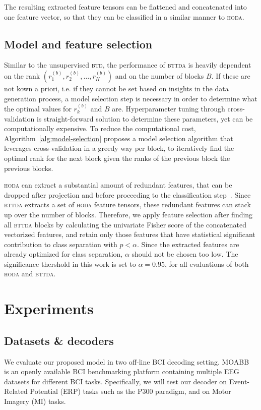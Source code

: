 \documentclass[twocolumn]{article}
\begin{document}
The resulting extracted feature tensors can be flattened and concatenated into
one feature vector, so that they can be classified in a similar manner to
\textsc{hoda}.


\subsection{Model and feature selection}
Similar to the unsupervised \textsc{btd}, the performance of \textsc{bttda} is
heavily dependent on the rank $\left(r_1^{(b)}, r_2^{(b)}, \ldots,
r_K^{(b)}\right)$ and on the number of blocks $B$.
If these are not kown a priori, i.e. if they cannot be set based on insights in the
data generation process, a model selection step is necessary in order to
determine what the optimal values for $r_k^{(b)}$ and $B$ are.
Hyperparameter tuning through cross-validation is straight-forward solution to
determine these parameters, yet can be computationally expensive.
To reduce the computational cost, Algorithm~\ref{alg:model-selection} proposes a model selection algorithm that
leverages cross-validation in a greedy way per block, to iteratively find the
optimal rank for the next block given the ranks of the previous block the previous blocks.

\textsc{hoda} can extract a substantial amount of redundant features, that can
be dropped after projection and before proceeding to the classification
step~\cite{Phan2010}.
Since \textsc{bttda} extracts a set of \textsc{hoda}
feature tensors, these redundant features can stack up over the number of
blocks.
Therefore, we apply feature selection after finding all \textsc{bttda} blocks
by calculating the univariate Fisher score of the concatenated vectorized
features, and retain only those features that have  statistical significant
contribution to class separation with $p<\alpha$.
Since the extracted features are already optimized for class separation,
$\alpha$ should not be chosen too low.
The significance thershold in this work is set to $\alpha=0.95$, for all
evaluations of both \textsc{hoda} and \textsc{bttda}.


\section{Experiments}
\subsection{Datasets \& decoders}
We evaluate our proposed model in two off-line BCI decoding setting.
MOABB~\cite{Aristimunha2023} is an openly available BCI benchmarking platform
containing multiple EEG datasets for different BCI tasks.
Specifically, we will test our decoder on Event-Related Potential (ERP) tasks
such as the P300 paradigm, and on Motor Imagery (MI) tasks.
\end{document}
